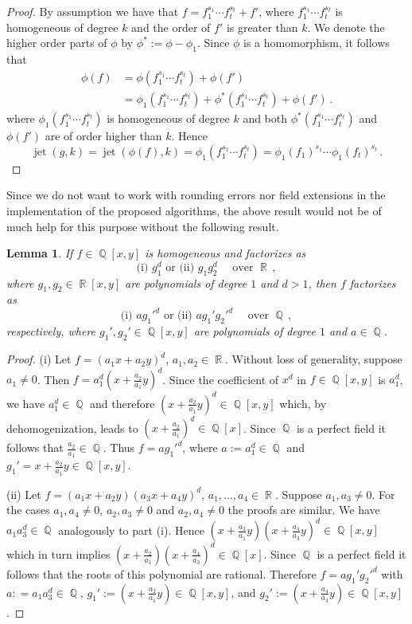 \documentclass[noend]{amsproc}
\newtheorem{lemma}[theorem]{Lemma}
\DeclareMathOperator{\jet}{jet}
\DeclareMathOperator{\Q}{\mathbb{Q}}
\DeclareMathOperator{\R}{\mathbb{R}}
\begin{document}
\begin{proof}
By assumption we have that $f = f_1^{s_1} \cdots f_t^{s_t} + f'$, where
$f_1^{s_1} \cdots f_t^{s_t}$ is homogeneous of degree $k$ and the order of $f'$
is greater than $k$. We denote the higher order parts of $\phi$ by
$\phi^* := \phi-\phi_1$. Since $\phi$ is a homomorphism, it follows that
\begin{align*}
\phi(f) &= \phi(f_1^{s_1} \cdots f_t^{s_t}) + \phi(f') \\
&= \phi_1(f_1^{s_1} \cdots f_t^{s_t})
+ \phi^*(f_1^{s_1} \cdots f_t^{s_t}) + \phi(f') \,.
\end{align*}
where $\phi_1(f_1^{s_1} \cdots f_t^{s_t})$ is homogeneous of degree $k$ and
both $\phi^*(f_1^{s_1} \cdots f_t^{s_t})$ and $\phi(f')$ are of order higher
than $k$. Hence
\[
\jet(g, k) = \jet(\phi(f), k) = \phi_1(f_1^{s_1} \cdots f_t^{s_t})
= \phi_1(f_1)^{s_1} \cdots \phi_1(f_t)^{s_t} \,.
\]
\end{proof}

Since we do not want to work with rounding errors nor field extensions in the
implementation of the proposed algorithms, the above result would not be of
much help for this purpose without the following result.

\begin{lemma}\label{x^3}
If $f \in \Q[x,y]$ is homogeneous and factorizes as
\[
\text{(i) } g_1^d \text{ or (ii) } g_1 g_2^d \quad \text{ over } \R \,,
\]
where $g_1, g_2 \in \R[x,y]$ are polynomials of degree $1$ and $d > 1$, then
$f$ factorizes as
\[
\text{(i) } ag_1'^d \text{ or (ii) } ag_1' g_2'^d
\quad \text{ over } \Q \,,
\]
respectively, where $g_1', g_2' \in \Q[x,y]$ are polynomials of degree $1$ and
$a \in \Q$.
\end{lemma}

\begin{proof}

(i) Let $f = (a_1x+a_2y)^d$, $a_1, a_2 \in \R$. Without loss of generality,
suppose $a_1 \neq 0$. Then $f = a_1^d(x+\frac{a_2}{a_1}y)^d$. Since the
coefficient of $x^d$ in $f \in \Q[x,y]$ is $a_1^d$, we have $a_1^d \in \Q$ and
therefore $(x+\frac{a_2}{a_1}y)^d \in \Q[x,y]$ which, by dehomogenization,
leads to $(x+\frac{a_2}{a_1})^d \in \Q[x]$. Since $\Q$ is a perfect field it
follows that $\frac{a_2}{a_1} \in \Q$. Thus $f = ag_1'^d$, where
$a := a_1^d \in \Q$ and $g_1' = x+\frac{a_2}{a_1}y \in \Q[x,y]$.

(ii) Let $f = (a_1x+a_2y)(a_3x+a_4y)^d$, $a_1,\ldots,a_4 \in \R$. Suppose
$a_1,a_3 \neq 0$. For the cases $a_1,a_4 \neq 0$, $a_2,a_3 \neq 0$ and
$a_2,a_4 \neq 0$ the proofs are similar. We have $a_1a_3^d \in \Q$ analogously
to part (i). Hence $(x+\frac{a_2}{a_1}y)(x+\frac{a_4}{a_3}y)^d \in \Q[x,y]$
which in turn implies $(x+\frac{a_2}{a_1})(x+\frac{a_4}{a_3})^d \in \Q[x]$.
Since $\Q$ is a perfect field it follows that the roots of this polynomial are
rational. Therefore $f = ag_1'g_2'^d$ with $a: = a_1a_3^d \in \Q$,
$g_1' := (x+\frac{a_2}{a_1}y) \in \Q[x,y]$, and
$g_2' := (x+\frac{a_4}{a_3}y) \in \Q[x,y]$.
\end{proof}
\end{document}
